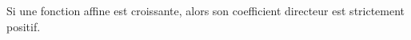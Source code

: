 Si une fonction affine est croissante, alors son coefficient directeur est strictement positif.

\begin{reponses}
\end{reponses}

\begin{comment}

\end{comment}

